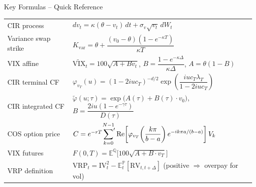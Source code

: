 \documentclass[aspectratio=169, 11pt]{beamer}
\begin{document}
\begin{frame}{Key Formulas -- Quick Reference}
\small
\renewcommand{\arraystretch}{1.6}
\begin{tabular}{@{}p{3.8cm}l@{}}
  \toprule
  CIR process & $dv_t = \kappa(\theta - v_t)\,dt + \sigma_v\sqrt{v_t}\,dW_t$ \\
  Variance swap strike & $K_{\mathrm{var}} = \theta + \dfrac{(v_0-\theta)(1-e^{-\kappa T})}{\kappa T}$ \\
  VIX affine & $\widetilde{\mathrm{VIX}}_t = 100\sqrt{A+Bv_t}$,\;\; $B=\dfrac{1-e^{-\kappa\Delta}}{\kappa\Delta}$,\;\; $A=\theta(1-B)$ \\
  CIR terminal CF & $\varphi_{v_T}(u)=(1-2iu c_T)^{-d/2}\exp\!\left(\dfrac{iu c_T\lambda_T}{1-2iu c_T}\right)$ \\
  CIR integrated CF & $\tilde\varphi(u;\tau) = \exp\!\bigl(A(\tau)+B(\tau)\cdot v_0\bigr)$,\;\; $B = \dfrac{2iu(1-e^{-\gamma\tau})}{D(\tau)}$ \\
  COS option price & $C=e^{-rT}\displaystyle\sideset{}{'}\sum_{k=0}^{N-1}
\mathrm{Re}\!\left[\varphi_{v_T}\!\left(\dfrac{k\pi}{b-a}\right)e^{-ik\pi a/(b-a)}\right]V_k$ \\
  VIX futures & $F(0,T)=\mathbb{E}^{\mathbb{Q}}\!\bigl[100\sqrt{A+B\cdot v_T}\bigr]$ \\
  VRP definition & $\mathrm{VRP}_t = \mathrm{IV}_t^2 - \mathbb{E}_t^{\mathbb{P}}[\mathrm{RV}_{t,t+\Delta}]$ \;(positive $\Rightarrow$ overpay for vol) \\
  \bottomrule
\end{tabular}
\end{frame}
\end{document}
